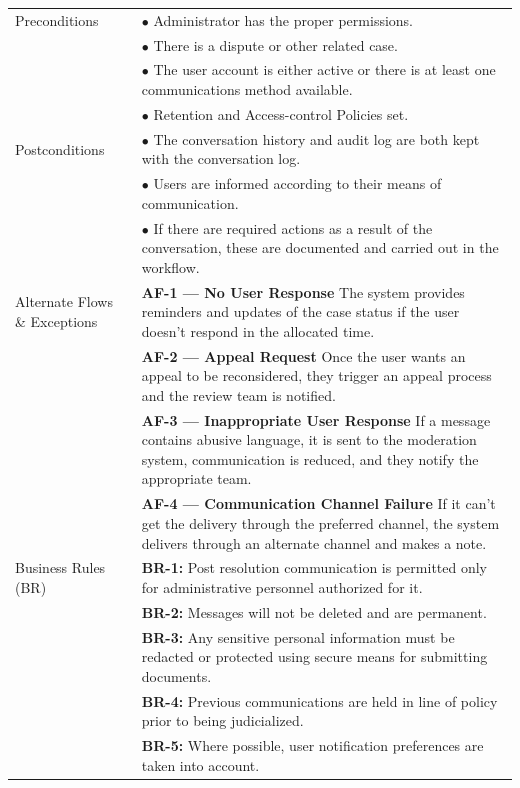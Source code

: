 \begin{longtable}{|>{\raggedright\arraybackslash}p{4cm}|>{\raggedright\arraybackslash}p{11cm}|}
\hline
Preconditions & $\bullet$ Administrator has the proper permissions. \\
& $\bullet$ There is a dispute or other related case. \\
& $\bullet$ The user account is either active or there is at least one communications method available. \\
& $\bullet$ Retention and Access-control Policies set. \\
\hline
Postconditions & $\bullet$ The conversation history and audit log are both kept with the conversation log. \\
& $\bullet$ Users are informed according to their means of communication. \\
& $\bullet$ If there are required actions as a result of the conversation, these are documented and carried out in the workflow. \\
\hline
Alternate Flows \& Exceptions & \textbf{AF-1 — No User Response} \newline The system provides reminders and updates of the case status if the user doesn't respond in the allocated time. \\
& \textbf{AF-2 — Appeal Request} \newline Once the user wants an appeal to be reconsidered, they trigger an appeal process and the review team is notified. \\
& \textbf{AF-3 — Inappropriate User Response} \newline If a message contains abusive language, it is sent to the moderation system, communication is reduced, and they notify the appropriate team. \\
& \textbf{AF-4 — Communication Channel Failure} \newline If it can't get the delivery through the preferred channel, the system delivers through an alternate channel and makes a note. \\
\hline
Business Rules (BR) & \textbf{BR-1:} Post resolution communication is permitted only for administrative personnel authorized for it. \\
& \textbf{BR-2:} Messages will not be deleted and are permanent. \\
& \textbf{BR-3:} Any sensitive personal information must be redacted or protected using secure means for submitting documents. \\
& \textbf{BR-4:} Previous communications are held in line of policy prior to being judicialized. \\
& \textbf{BR-5:} Where possible, user notification preferences are taken into account. \\

\end{longtable}
